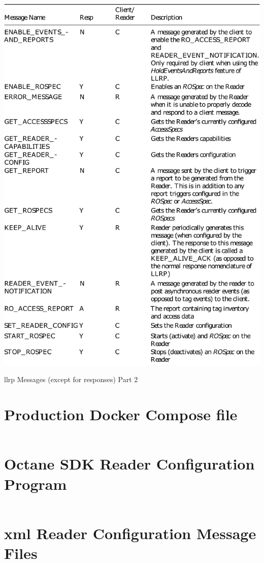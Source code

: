 \begin{appendices}
\begin{table}
    \centering
    \includegraphics[width=\textwidth]{./figs/02-state-of-the-art/table_llrpmessages_2.pdf}
    \caption[\ac{llrp} Messages (except for responses) Part 2]{\ac{llrp} Messages (except for responses) Part 2~\cite{ImpinjLTKProgrammers}} 
    \label{tab:llrpmessages2}
\end{table}

\clearpage

\section{Production Docker Compose file} \label{apx:composefile}
\inputminted[linenos, breaklines, frame=single]{yaml}{./code/docker-compose-production.yml}

\clearpage

\section{Octane SDK Reader Configuration Program} \label{apx:octanereaderconfig}
\inputminted[linenos, breaklines, frame=single]{java}{./code/App.java}

\clearpage

\section{\acs{xml} Reader Configuration Message Files} \label{apx:xmlreaderconfig}
\inputminted[linenos, breaklines, frame=single]{xml}{./code/SET_READER_CONFIG.xml}
\pagebreak
\inputminted[linenos, breaklines, frame=single]{xml}{./code/ADD_ROSPEC.xml}

\end{appendices}